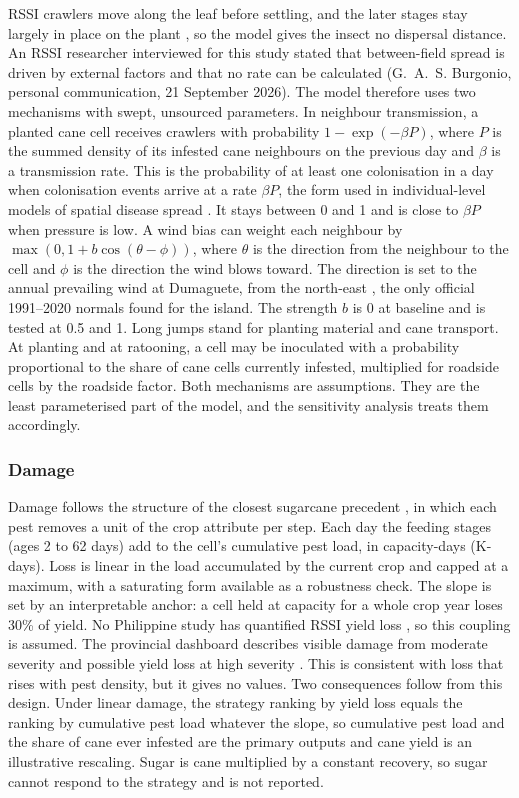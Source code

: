 RSSI crawlers move along the leaf before settling, and the later stages stay largely in place on the plant \citep{Guerrero2026}, so the model gives the insect no dispersal distance. An RSSI researcher interviewed for this study stated that between-field spread is driven by external factors and that no rate can be calculated (G.~A.~S. Burgonio, personal communication, 21 September 2026). The model therefore uses two mechanisms with swept, unsourced parameters. In neighbour transmission, a planted cane cell receives crawlers with probability $1-\exp(-\beta P)$, where $P$ is the summed density of its infested cane neighbours on the previous day and $\beta$ is a transmission rate. This is the probability of at least one colonisation in a day when colonisation events arrive at a rate $\beta P$, the form used in individual-level models of spatial disease spread \citep{Deardon2010}. It stays between 0 and 1 and is close to $\beta P$ when pressure is low. A wind bias can weight each neighbour by $\max(0, 1 + b\cos(\theta-\phi))$, where $\theta$ is the direction from the neighbour to the cell and $\phi$ is the direction the wind blows toward. The direction is set to the annual prevailing wind at Dumaguete, from the north-east \citep{PAGASAnd}, the only official 1991--2020 normals found for the island. The strength $b$ is 0 at baseline and is tested at 0.5 and 1. Long jumps stand for planting material and cane transport. At planting and at ratooning, a cell may be inoculated with a probability proportional to the share of cane cells currently infested, multiplied for roadside cells by the roadside factor. Both mechanisms are assumptions. They are the least parameterised part of the model, and the sensitivity analysis treats them accordingly.

\subsubsection{Damage}

Damage follows the structure of the closest sugarcane precedent \citep{Alves2026}, in which each pest removes a unit of the crop attribute per step. Each day the feeding stages (ages 2 to 62 days) add to the cell's cumulative pest load, in capacity-days (K-days). Loss is linear in the load accumulated by the current crop and capped at a maximum, with a saturating form available as a robustness check. The slope is set by an interpretable anchor: a cell held at capacity for a whole crop year loses 30\% of yield. No Philippine study has quantified RSSI yield loss \citep{Guerrero2024}, so this coupling is assumed. The provincial dashboard describes visible damage from moderate severity and possible yield loss at high severity \citep{PGNO2026}. This is consistent with loss that rises with pest density, but it gives no values. Two consequences follow from this design. Under linear damage, the strategy ranking by yield loss equals the ranking by cumulative pest load whatever the slope, so cumulative pest load and the share of cane ever infested are the primary outputs and cane yield is an illustrative rescaling. Sugar is cane multiplied by a constant recovery, so sugar cannot respond to the strategy and is not reported.

